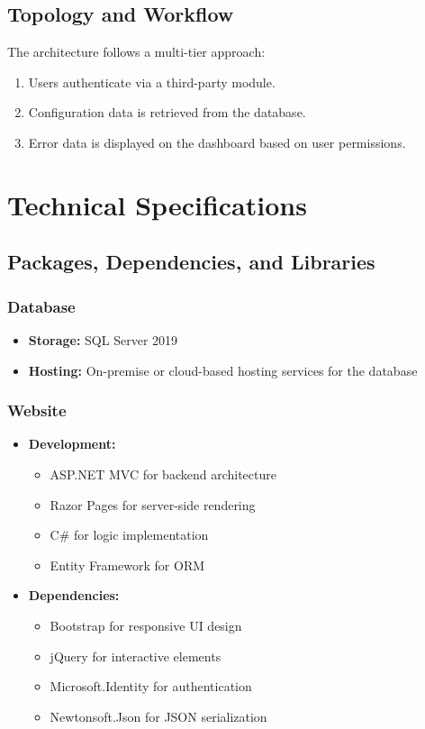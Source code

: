 \documentclass[12pt]{article}
\begin{document}
\subsection{Topology and Workflow}
The architecture follows a multi-tier approach:
\begin{enumerate}
    \item Users authenticate via a third-party module.
    \item Configuration data is retrieved from the database.
    \item Error data is displayed on the dashboard based on user permissions.
\end{enumerate}

\section{Technical Specifications}
\subsection{Packages, Dependencies, and Libraries}
\subsubsection{Database}
\begin{itemize}
    \item \textbf{Storage:} SQL Server 2019
    \item \textbf{Hosting:} On-premise or cloud-based hosting services for the database
\end{itemize}

\subsubsection{Website}
\begin{itemize}
    \item \textbf{Development:}
    \begin{itemize}
        \item ASP.NET MVC for backend architecture
        \item Razor Pages for server-side rendering
        \item C\# for logic implementation
        \item Entity Framework for ORM
    \end{itemize}
    \item \textbf{Dependencies:}
    \begin{itemize}
        \item Bootstrap for responsive UI design
        \item jQuery for interactive elements
        \item Microsoft.Identity for authentication
        \item Newtonsoft.Json for JSON serialization
    \end{itemize}
\end{itemize}
\end{document}
